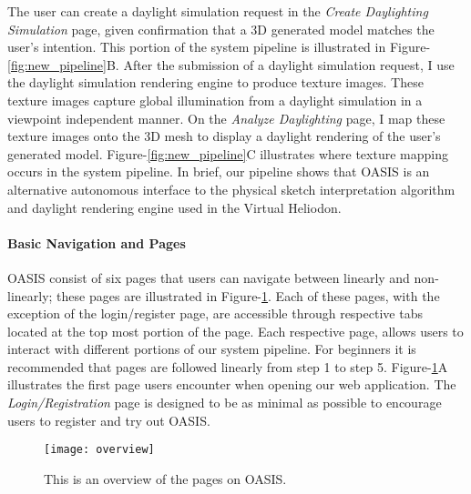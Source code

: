 The user can create a daylight simulation request in the \textit{Create Daylighting Simulation} page, given confirmation that a 3D generated model matches the user's intention.
This portion of the system pipeline is illustrated in Figure-\ref{fig:new_pipeline}B.
After the submission of a daylight simulation request, I use the daylight simulation rendering engine to produce texture images.
These texture images capture global illumination from a daylight simulation in a viewpoint independent manner.
On the \textit{Analyze Daylighting} page, I map these texture images onto the 3D mesh to display a daylight rendering of the user's generated model.
Figure-\ref{fig:new_pipeline}C illustrates where texture mapping occurs in the system pipeline.
In brief, our pipeline shows that OASIS is an alternative autonomous interface to the physical sketch interpretation algorithm and daylight rendering engine used in the Virtual Heliodon.



\paragraph{Basic Navigation and Pages}

OASIS consist of six pages that users can navigate between linearly and non-linearly; these pages are illustrated in Figure-\ref{fig:overview}.
Each of these pages, with the exception of the login/register page, are accessible through respective tabs located at the top most portion of the page.
Each respective page, allows users to interact with different portions of our system pipeline.
For beginners it is recommended that pages are followed linearly from step 1 to step 5.
Figure-\ref{fig:overview}A illustrates the first page users encounter when opening our web application.
The \textit{Login/Registration} page is designed to be as minimal as possible to encourage users to register and try out OASIS.

\begin{figure}[!ht]
\centering
\texttt{[image: overview]}
\caption{This is an overview of the pages on OASIS.}
\label{fig:overview}
\end{figure}

